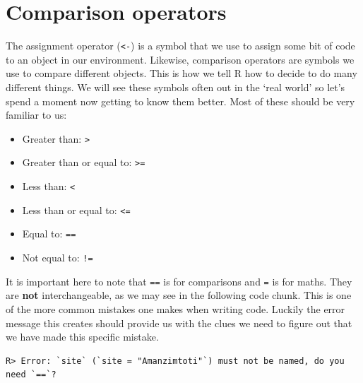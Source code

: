 \documentclass[]{book}
\newenvironment{Shaded}{\begin{snugshade}}{\end{snugshade}}
\newcommand{\KeywordTok}[1]{\textcolor[rgb]{0.13,0.29,0.53}{\textbf{#1}}}
\newcommand{\DataTypeTok}[1]{\textcolor[rgb]{0.13,0.29,0.53}{#1}}
\newcommand{\StringTok}[1]{\textcolor[rgb]{0.31,0.60,0.02}{#1}}
\newcommand{\OperatorTok}[1]{\textcolor[rgb]{0.81,0.36,0.00}{\textbf{#1}}}
\newcommand{\NormalTok}[1]{#1}
\providecommand{\tightlist}{%
  \setlength{\itemsep}{0pt}\setlength{\parskip}{0pt}}
\theoremstyle{definition}
\theoremstyle{definition}
\theoremstyle{definition}
\theoremstyle{remark}
\begin{document}
\section{Comparison operators}\label{comparison-operators}

The assignment operator (\texttt{\textless{}-}) is a symbol that we use
to assign some bit of code to an object in our environment. Likewise,
comparison operators are symbols we use to compare different objects.
This is how we tell R how to decide to do many different things. We will
see these symbols often out in the `real world' so let's spend a moment
now getting to know them better. Most of these should be very familiar
to us:

\begin{itemize}
\tightlist
\item
  Greater than: \texttt{\textgreater{}}\\
\item
  Greater than or equal to: \texttt{\textgreater{}=}\\
\item
  Less than: \texttt{\textless{}}\\
\item
  Less than or equal to: \texttt{\textless{}=}\\
\item
  Equal to: \texttt{==}\\
\item
  Not equal to: \texttt{!=}
\end{itemize}

It is important here to note that \texttt{==} is for comparisons and
\texttt{=} is for maths. They are \textbf{not} interchangeable, as we
may see in the following code chunk. This is one of the more common
mistakes one makes when writing code. Luckily the error message this
creates should provide us with the clues we need to figure out that we
have made this specific mistake.

\begin{Shaded}
\end{Shaded}

\begin{verbatim}
R> Error: `site` (`site = "Amanzimtoti"`) must not be named, do you need `==`?
\end{verbatim}
\end{document}
